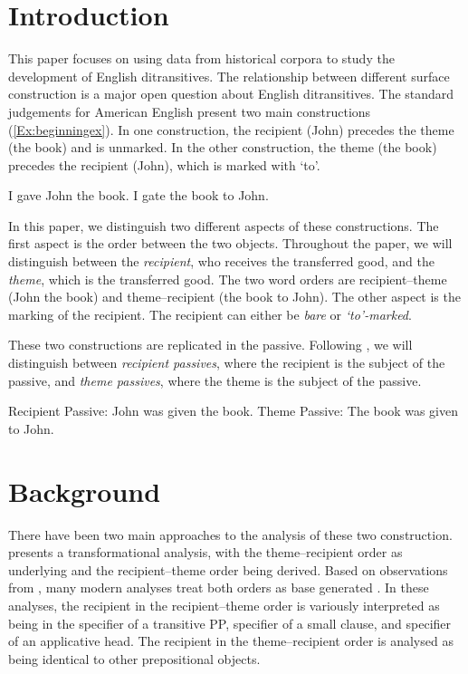 \section{Introduction}

This paper focuses on using data from historical corpora to study the development of English ditransitives. The relationship between different surface construction is a major open question about English ditransitives. The standard judgements for American English present two main constructions (\ref{Ex:beginningex}). In one construction, the recipient (John) precedes the theme (the book) and is unmarked. In the other construction, the theme (the book) precedes the recipient (John), which is marked with `to'.

\begin{exe}
\ex \label{Ex:beginningex}
\begin{xlist}
\ex I gave John the book.
\ex I gate the book to John.
\end{xlist}
\end{exe}

In this paper, we distinguish two different aspects of these constructions. The first aspect is the order between the two objects. Throughout the paper, we will distinguish between the \textit{recipient}, who receives the transferred good, and the \textit{theme}, which is the transferred good. The two word orders are recipient--theme (John the book) and theme--recipient (the book to John). The other aspect is the marking of the recipient. The recipient can either be \textit{bare} or \textit{`to'-marked}. 

These two constructions are replicated in the passive. Following \cite{Allen.1999}, we will distinguish between \textit{recipient passives}, where the recipient is the subject of the passive, and \textit{theme passives}, where the theme is the subject of the passive.

\begin{exe}
\ex
\begin{xlist}
\ex Recipient Passive: John was given the book.
\ex Theme Passive: The book was given to John.
\end{xlist}
\end{exe}

\section{Background}
There have been two main approaches to the analysis of these two construction. \cite{Larson.1988} presents a transformational analysis, with the theme--recipient order as underlying and the recipient--theme order being derived. Based on observations from \cite{Oehrle.1976}, many modern analyses treat both orders as base generated \citep[and others]{Kayne.1984,Gropen.1989,Pinker.1989,Jackendoff.1990,Bowers.1993,Hale.1993,DenDikken.1995,Harley.2002,Bruening.2010,Bruening.2010b,Bruening.2014,Harley.2015}. In these analyses, the recipient in the recipient--theme order is variously interpreted as being in the specifier of a transitive PP, specifier of a small clause, and specifier of an applicative head. The recipient in the theme--recipient order is analysed as being identical to other prepositional objects.

